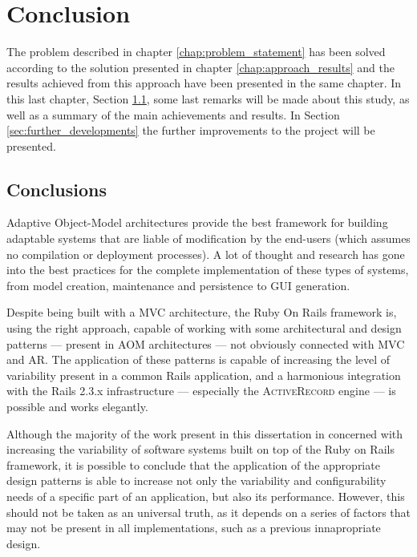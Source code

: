 \chapter{Conclusion}\label{chap:conclusion}

The problem described in chapter \ref{chap:problem_statement} has been solved according to the solution presented in chapter \ref{chap:approach_results} and the results achieved from this approach have been presented in the same chapter. In this last chapter, Section \ref{sec:conclusions}, some last remarks will be made about this study, as well as a summary of the main achievements and results. In Section \ref{sec:further_developments} the further improvements to the project will be presented.

\section{Conclusions}\label{sec:conclusions}

Adaptive Object-Model architectures provide the best framework for building adaptable systems that are liable of modification by the end-users (which assumes no compilation or deployment processes). A lot of thought and research has gone into the best practices for the complete implementation of these types of systems, from model creation, maintenance and persistence to GUI generation.

Despite being built with a MVC architecture, the Ruby On Rails framework is, using the right approach, capable of working with some architectural and design patterns --- present in AOM architectures --- not obviously connected with MVC and AR. The application of these patterns is capable of increasing the level of variability present in a common Rails application, and a harmonious integration with the Rails 2.3.x infrastructure --- especially the \textsc{ActiveRecord} engine --- is possible and works elegantly.

Although the majority of the work present in this dissertation in concerned with increasing the variability of software systems built on top of the Ruby on Rails framework, it is possible to conclude that the application of the appropriate design patterns is able to increase not only the variability and configurability needs of a specific part of an application, but also its performance. However, this should not be taken as an universal truth, as it depends on a series of factors that may not be present in all implementations, such as a previous innapropriate design.

